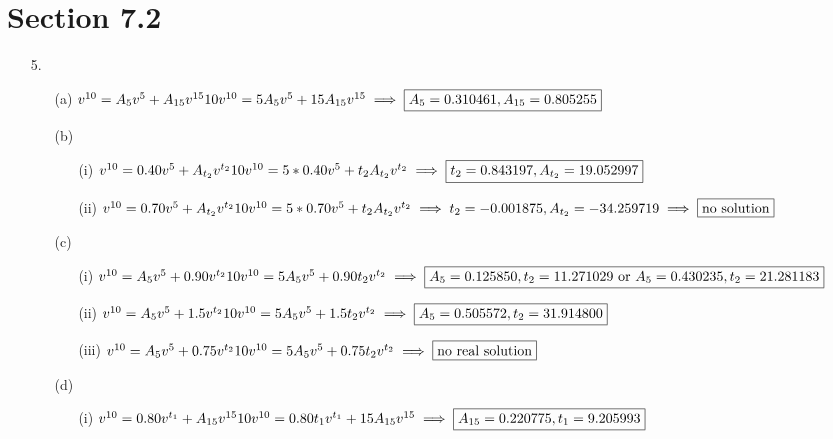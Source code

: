 \documentclass{article}
\begin{document}
\section*{Section 7.2}
\begin{itemize}
	\item [5.]
	      \begin{itemize}
		      \item [(a)] $v^{10}=A_5v^5+A_{15}v^{15}\\10v^{10}=5A_5v^5+15A_{15}v^{15}\\\implies \boxed{A_5=0.310461, A_{15}=0.805255}$
		      \item [(b)]
		            \begin{itemize}
			            \item [(i)] $v^{10}=0.40v^5+A_{t_2}v^{t_2}\\10v^{10}=5*0.40v^5+t_2A_{t_2}v^{t_2}\\\implies \boxed{t_2=0.843197, A_{t_2}=19.052997}$
			            \item [(ii)] $v^{10}=0.70v^5+A_{t_2}v^{t_2}\\10v^{10}=5*0.70v^5+t_2A_{t_2}v^{t_2}\\\implies t_2=-0.001875, A_{t_2}=-34.259719 \implies \boxed{\text{no solution}}$
		            \end{itemize}
		      \item [(c)]
		            \begin{itemize}
			            \item [(i)] $v^{10}=A_5v^5+0.90v^{t_2}\\10v^{10}=5A_5v^5+0.90t_2v^{t_2}\\\implies \boxed{A_5=0.125850, t_2=11.271029 \text{ or } A_5=0.430235, t_2=21.281183}$
			            \item [(ii)] $v^{10}=A_5v^5+1.5v^{t_2}\\10v^{10}=5A_5v^5+1.5t_2v^{t_2}\\\implies \boxed{A_5=0.505572, t_2=31.914800}$
			            \item [(iii)] $v^{10}=A_5v^5+0.75v^{t_2}\\10v^{10}=5A_5v^5+0.75t_2v^{t_2}\\\implies \boxed{\text{no real solution}}$
		            \end{itemize}
		      \item [(d)] \begin{itemize}
			            \item [(i)] $v^{10}=0.80v^{t_1}+A_{15}v^{15}\\10v^{10}=0.80t_1v^{t_1}+15A_{15}v^{15}\\\implies \boxed{A_{15}=0.220775, t_{1}=9.205993}$

\end{itemize}
\end{itemize}
\end{itemize}
\end{document}
